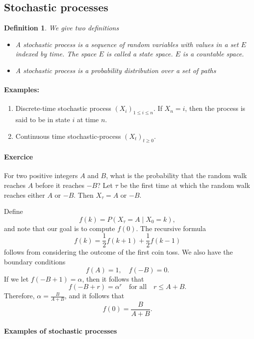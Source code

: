 \documentclass[12pt,a4paper]{article}
\newtheorem{definition}{Definition}
\begin{document}
\newpage
\subsection{Stochastic processes}
\begin{definition}
	We give two definitions
	\begin{itemize}
		\item 
		A stochastic process is a sequence of random variables with values in a set $E$ indexed by time.
		The space $E$ is called a state space. $E$ is a countable space. 
		\item A stochastic process is a probability distribution over a set of paths
	\end{itemize}
	\end{definition}
\paragraph{Examples:}
\begin{enumerate}
	\item Discrete-time stochastic process $(X_i)_{1\leq i\leq n}$. If $X_n = i$, then the process is said to be in state $i$ at time $n$.
	\item Continuous time stochastic-process $(X_t)_{t\geq 0}$.
\end{enumerate}
\paragraph{Exercice}
For two positive integers \( A \) and \( B \), what is the probability that the random walk reaches \( A \) before it reaches \( -B \)? Let \( \tau \) be the first time at which the random walk reaches either \( A \) or \( -B \). Then \( X_\tau = A \) or \( -B \).

Define
$$
f(k) = P(X_\tau = A \mid X_0 = k),
$$
and note that our goal is to compute \( f(0) \). The recursive formula
$$
f(k) = \frac{1}{2} f(k+1) + \frac{1}{2} f(k-1)
$$
follows from considering the outcome of the first coin toss. We also have the boundary conditions
$$
f(A) = 1, \quad f(-B) = 0.
$$
If we let \( f(-B+1) = \alpha \), then it follows that
$$
f(-B + r) = \alpha^r \quad \text{for all} \quad r \leq A + B.
$$
Therefore, \( \alpha = \frac{B}{A + B} \), and it follows that
$$
f(0) = \frac{B}{A + B}.
$$


	
\paragraph{Examples of stochastic processes}
\end{document}

